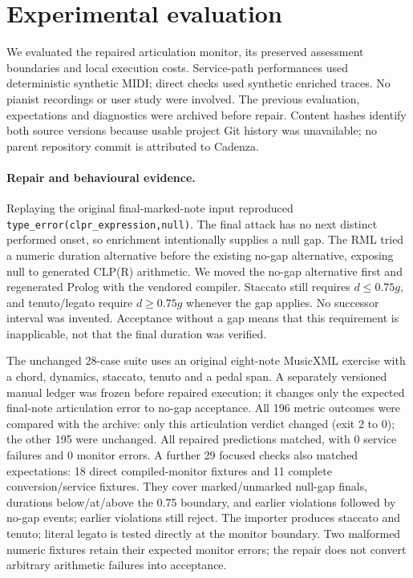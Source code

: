 \section{Experimental evaluation}
\label{sec:evaluation}
We evaluated the repaired articulation monitor, its preserved assessment
boundaries and local execution costs. Service-path performances used
deterministic synthetic MIDI; direct checks used synthetic enriched traces.
No pianist recordings or user study were involved.
The previous evaluation, expectations and diagnostics were archived before
repair. Content hashes identify both source versions because usable project
Git history was unavailable; no parent repository commit is attributed to Cadenza.

\paragraph{Repair and behavioural evidence.}
Replaying the original final-marked-note input reproduced
\texttt{type\_error(clpr\_expression,null)}. The final attack has no next
distinct performed onset, so enrichment intentionally supplies a null gap.
The RML tried a numeric duration alternative before the existing no-gap
alternative, exposing null to generated CLP(R) arithmetic. We moved the
no-gap alternative first and regenerated Prolog with the vendored compiler.
Staccato still requires $d\leq0.75g$, and tenuto/legato require
$d\geq0.75g$ whenever the gap applies. No successor interval was invented.
Acceptance without a gap means that this requirement is inapplicable,
not that the final duration was verified.

The unchanged 28-case suite uses an original eight-note MusicXML
exercise with a chord, dynamics, staccato, tenuto and a pedal span. A separately
versioned manual ledger was frozen before repaired execution; it changes only
the expected final-note articulation error to no-gap acceptance.
All 196 metric outcomes were compared with the archive:
only this articulation verdict changed (exit 2 to 0); the other
195 were unchanged. All repaired predictions matched,
with 0 service failures and 0 monitor errors.
A further 29 focused checks also matched expectations:
18 direct compiled-monitor fixtures and 11 complete
conversion/service fixtures. They cover marked/unmarked null-gap finals,
durations below/at/above the 0.75 boundary, and earlier violations followed
by no-gap events; earlier violations still reject. The importer produces
staccato and tenuto; literal legato is tested directly at the monitor boundary.
Two malformed numeric fixtures retain their expected monitor errors;
the repair does not convert arbitrary arithmetic failures into acceptance.

